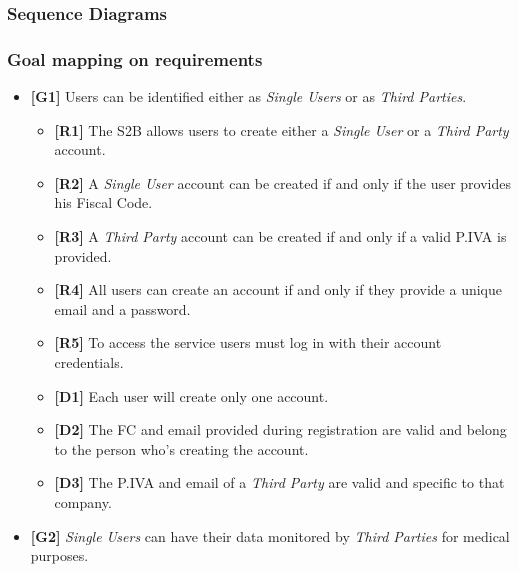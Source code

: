 \documentclass[titlepage]{article}
\begin{document}
			\subsubsection{Sequence Diagrams}
									
			\subsubsection{Goal mapping on requirements}
			
			\begin{itemize} %

   				 \item {\bf [G1]} Users can be identified either as {\it {\it Single User}s} or as {\it Third Parties}.	
				 
				 	\begin{itemize} %
						\item {\bf[R1]} The S2B allows users to create either a {\it Single User} or a {\it Third Party} account. 
\item {\bf[R2]}  A {\it Single User} account can be created if and only if the user provides his Fiscal Code. 
\item {\bf[R3]}  A {\it Third Party} account can be created if and only if a valid P.IVA is provided. 
\item {\bf[R4]}  All users can create an account if and only if they provide a unique email and a password. 
\item {\bf[R5]}  To access the service users must log in with their account credentials. 
\item {\bf[D1]}  Each user will create only one account.
\item {\bf[D2]}  The FC and email provided during registration are valid and belong to the person who’s creating the account.
\item {\bf[D3]}  The P.IVA and email of a {\it Third Party} are valid and specific to that company.
					\end{itemize}
   				 \item {\bf [G2]}  {\it {\it Single User}s} can have their data monitored by {\it Third Parties} for medical purposes.
				 

\end{itemize}
\end{document}
